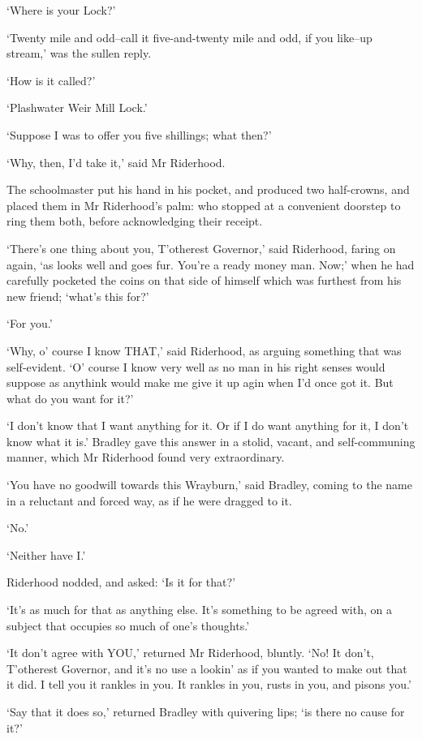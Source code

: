 ‘Where is your Lock?’

‘Twenty mile and odd--call it five-and-twenty mile and odd, if you
like--up stream,’ was the sullen reply.

‘How is it called?’

‘Plashwater Weir Mill Lock.’

‘Suppose I was to offer you five shillings; what then?’

‘Why, then, I’d take it,’ said Mr Riderhood.

The schoolmaster put his hand in his pocket, and produced two
half-crowns, and placed them in Mr Riderhood’s palm: who stopped at
a convenient doorstep to ring them both, before acknowledging their
receipt.

‘There’s one thing about you, T’otherest Governor,’ said Riderhood,
faring on again, ‘as looks well and goes fur. You’re a ready money man.
Now;’ when he had carefully pocketed the coins on that side of himself
which was furthest from his new friend; ‘what’s this for?’

‘For you.’

‘Why, o’ course I know THAT,’ said Riderhood, as arguing something that
was self-evident. ‘O’ course I know very well as no man in his right
senses would suppose as anythink would make me give it up agin when I’d
once got it. But what do you want for it?’

‘I don’t know that I want anything for it. Or if I do want anything
for it, I don’t know what it is.’ Bradley gave this answer in a stolid,
vacant, and self-communing manner, which Mr Riderhood found very
extraordinary.

‘You have no goodwill towards this Wrayburn,’ said Bradley, coming to
the name in a reluctant and forced way, as if he were dragged to it.

‘No.’

‘Neither have I.’

Riderhood nodded, and asked: ‘Is it for that?’

‘It’s as much for that as anything else. It’s something to be agreed
with, on a subject that occupies so much of one’s thoughts.’

‘It don’t agree with YOU,’ returned Mr Riderhood, bluntly. ‘No! It
don’t, T’otherest Governor, and it’s no use a lookin’ as if you wanted
to make out that it did. I tell you it rankles in you. It rankles in
you, rusts in you, and pisons you.’

‘Say that it does so,’ returned Bradley with quivering lips; ‘is there
no cause for it?’

